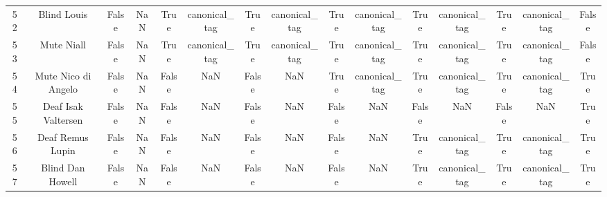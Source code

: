 \begin{table}[h!]
{\begin{tabular}{|c|c|c|c|c|c|c|c|c|c|c|c|c|c|c|}
         52 &                                       Blind Louis &                          False &                       NaN &                           True &             canonical\_tag &                           True &             canonical\_tag &                           True &             canonical\_tag &                           True &             canonical\_tag &                           True &             canonical\_tag &                          False \\
         53 &                                        Mute Niall &                          False &                       NaN &                           True &             canonical\_tag &                           True &             canonical\_tag &                           True &             canonical\_tag &                           True &             canonical\_tag &                           True &             canonical\_tag &                          False \\
         54 &                               Mute Nico di Angelo &                          False &                       NaN &                          False &                       NaN &                          False &                       NaN &                           True &             canonical\_tag &                           True &             canonical\_tag &                           True &             canonical\_tag &                           True \\
         55 &                               Deaf Isak Valtersen &                          False &                       NaN &                          False &                       NaN &                          False &                       NaN &                          False &                       NaN &                          False &                       NaN &                          False &                       NaN &                           True \\
         56 &                                  Deaf Remus Lupin &                          False &                       NaN &                          False &                       NaN &                          False &                       NaN &                          False &                       NaN &                           True &             canonical\_tag &                           True &             canonical\_tag &                           True \\
         57 &                                  Blind Dan Howell &                          False &                       NaN &                          False &                       NaN &                          False &                       NaN &                          False &                       NaN &                           True &             canonical\_tag &                           True &             canonical\_tag &                           True \\

\end{tabular}}
\end{table}
